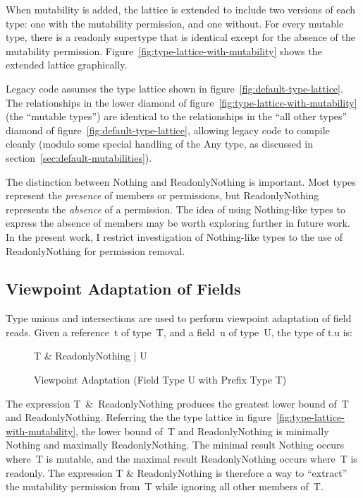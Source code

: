 When mutability is added, the lattice is extended to include two versions of each type: one with the mutability permission, and one without. For every mutable type, there is a readonly supertype that is identical except for the absence of the mutability permission. Figure~\ref{fig:type-lattice-with-mutability} shows the extended lattice graphically.

Legacy code assumes the type lattice shown in figure~\ref{fig:default-type-lattice}. The relationships in the lower diamond of figure~\ref{fig:type-lattice-with-mutability} (the ``mutable types'') are identical to the relationships in the ``all other types'' diamond of figure~\ref{fig:default-type-lattice}, allowing legacy code to compile cleanly (modulo some special handling of the {\cd Any} type, as discussed in section~\ref{sec:default-mutabilities}).

The distinction between {\cd Nothing} and {\cd ReadonlyNothing} is important. Most types represent the {\em presence} of members or permissions, but {\cd ReadonlyNothing} represents the {\em absence} of a permission. The idea of using {\cd Nothing}-like types to express the absence of members may be worth exploring further in future work. In the present work, I restrict investigation of {\cd Nothing}-like types to the use of {\cd ReadonlyNothing} for permission removal.



\subsection{Viewpoint Adaptation of Fields} \label{sec:viewpoint-adaptation}

Type unions and intersections are used to perform viewpoint adaptation of field reads.
Given a reference~{\cd t} of type~{\cd T}, and a field~{\cd u} of type~{\cd U}, the type of \mbox{\cd t.u} is:
\begin{figure}[h]
\center
{\cd T \& ReadonlyNothing | U}
\caption{Viewpoint Adaptation (Field Type {\cd U} with Prefix Type {\cd T})}
\label{fig:viewpoint-adapted-type}
\end{figure}

The expression \mbox{\cd T \& ReadonlyNothing} produces the greatest lower bound of~{\cd T} and {\cd ReadonlyNothing}. Referring the the type lattice in figure~\ref{fig:type-lattice-with-mutability}, the lower bound of~{\cd T} and {\cd ReadonlyNothing} is minimally {\cd Nothing} and maximally {\cd ReadonlyNothing}. The minimal result {\cd Nothing} occurs where~{\cd T} is mutable, and the maximal result {\cd ReadonlyNothing} occurs where~{\cd T} is readonly. The expression {\cd T \& ReadonlyNothing} is therefore a way to ``extract'' the mutability permission from~{\cd T} while ignoring all other members of~{\cd T}.


